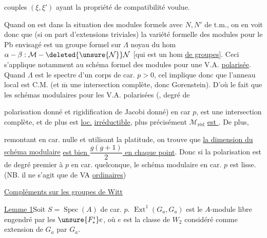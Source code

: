 couples $(\xi,\xi')$ ayant la propriété de compatibilité voulue.

Quand on est dans la situation des modules formels
 avec $N,N'$ de t.m., on en voit donc
que (si on part d'extensions triviales) la variété formelle des
modules pour le Pb envisagé est un groupe formel
 sur $\Lambda$
noyau du hom
$\alpha-\beta:\mathcal M-\deleted{\unsure{\mathcal N}}\mathcal N$
[qui est un hom \uline{de groupes}].
Ceci s'applique notamment au schéma formel des modules pour une
V.A. \uline{polarisée}. Quand $\Lambda$ est le spectre
d'un corps de car. $p>0$, cel implique donc que l'anneau local
 est C.M. (et $\overline{\mathrm m}$ 
une intersection complète, donc Gorenstein).
D'où le fait que les schémas  modulaires pour les
V.A. polarisées 
(, degré de

polarisation donné et rigidification de Jacobi
 donné) en car $p$, est 
une intersection complète, et de plus est \uline{loc.}
\uline{irréductible}, plus précisément
$\mathcal M_{\text{réd}}$ \uline{est }
.
De plus, 

remontant en car. nulle et utilisant la platitude, on trouve que
\uline{la dimension du schéma modulaire} 
\uline{est bien $\dfrac{g(g+1)}2$ en chaque point}.
Donc si la polarisation est de degré premier à $p$
 en car. quelconque, le schéma modulaire en car. $p$
est lisse.
(NB. il ne s'agit que de VA \uline{ordinaires})

\uline{Compléments sur les groupes de Witt}

\uline{Lemme 1}\quad Soit $S=\operatorname{Spec}(A)$ de car. $p$.
\deleted{Posons $\unsure{A[F]=\mathbb F_p[F}$}
$\operatorname{Ext}^1(G_a,G_a)$ est le
 $A$-module libre engendré par les
$\unsure{F_*^i}e$,
où $e$ est la classe de $W_2$ considéré comme extension de $G_a$ par $G_a$.


